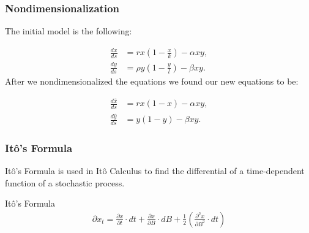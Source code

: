 

\begin{frame}
\frametitle{Nondimensionalization}

The initial model is the following:

  \begin{align*}
    \frac{dx}{ds} & = rx \left(1-\frac{x}{k}\right) - \alpha xy, \\
    \frac{dy}{ds} & = \rho y \left(1-\frac{y}{l}\right) - \beta xy.
  \end{align*}
After we nondimensionalized the equations we found our new equations to be:

	\begin{align*}
		\frac{d\hat{x}}{ds} &= rx(1-x) - \alpha xy, \\
		\frac{d\hat{y}}{ds} &= y(1-y) - \beta xy.
	\end{align*}
\end{frame}



\begin{frame}
\frametitle{It\^o's Formula}
It\^o's Formula is used in It\^o Calculus to find the differential of a time-dependent function of a stochastic process.

		 \begin{block}{It\^o's Formula}
      \begin{align*}
				\partial x_t = \frac{\partial x}{\partial t} \cdot dt + \frac{\partial x}{\partial B} \cdot dB + \frac{1}{2} \left(\frac{\partial ^2 x}{\partial B ^2} \cdot dt\right)
			\end{align*}
    \end{block}
		
\end{frame}

